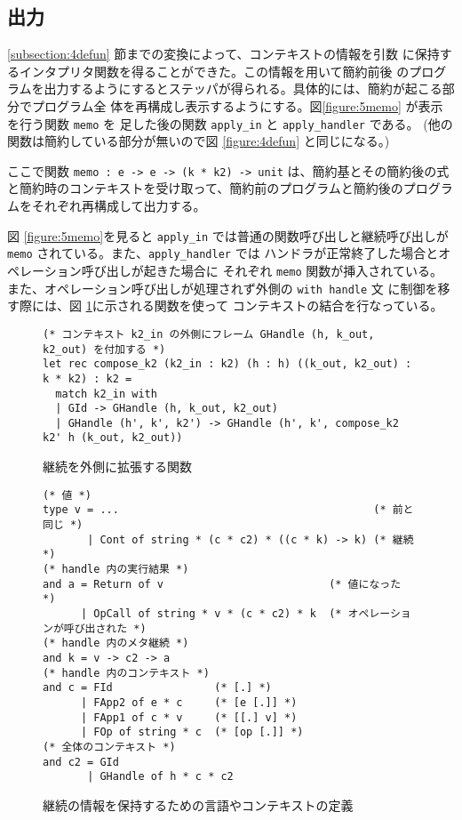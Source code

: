 \subsection{出力}
\label{subsection:memo}

\ref{subsection:4defun} 節までの変換によって、コンテキストの情報を引数
に保持するインタプリタ関数を得ることができた。この情報を用いて簡約前後
のプログラムを出力するようにするとステッパが得られる。具体的には、簡約が起こる部分でプログラム全
体を再構成し表示するようにする。図\ref{figure:5memo}
が表示を行う関数 \texttt{memo} を
足した後の関数 \texttt{apply\_in} と \texttt{apply\_handler}
である。
(他の関数は簡約している部分が無いので図 \ref{figure:4defun} と同じになる。)

ここで関数 \texttt{memo :\ e -> e -> (k * k2) -> unit} は、簡約基とその簡約後の式と簡約時のコンテキストを受け取って、簡約前のプログラムと簡約後のプログラムをそれぞれ再構成して出力する。

図 \ref{figure:5memo}を見ると \texttt{apply\_in} では普通の関数呼び出しと継続呼び出しが
\texttt{memo} されている。また、\texttt{apply\_handler} では
ハンドラが正常終了した場合とオペレーション呼び出しが起きた場合に
それぞれ \texttt{memo} 関数が挿入されている。
また、オペレーション呼び出しが処理されず外側の \texttt{with handle} 文
に制御を移す際には、図 \ref{figure:compose}に示される関数を使って
コンテキストの結合を行なっている。

\begin{figure}[t]
\begin{spacing}{0.9} 
\begin{verbatim}
(* コンテキスト k2_in の外側にフレーム GHandle (h, k_out, k2_out) を付加する *)
let rec compose_k2 (k2_in : k2) (h : h) ((k_out, k2_out) : k * k2) : k2 =
  match k2_in with
  | GId -> GHandle (h, k_out, k2_out)
  | GHandle (h', k', k2') -> GHandle (h', k', compose_k2 k2' h (k_out, k2_out))
\end{verbatim}
\caption{継続を外側に拡張する関数}
\label{figure:compose}
\end{spacing}
\end{figure}

\begin{figure}[t]
\begin{spacing}{0.9} 
\begin{verbatim}
(* 値 *)
type v = ...                                        (* 前と同じ *)
       | Cont of string * (c * c2) * ((c * k) -> k) (* 継続 *)
(* handle 内の実行結果 *)
and a = Return of v                          (* 値になった *)
      | OpCall of string * v * (c * c2) * k  (* オペレーションが呼び出された *)
(* handle 内のメタ継続 *)
and k = v -> c2 -> a
(* handle 内のコンテキスト *)
and c = FId                (* [.] *)
      | FApp2 of e * c     (* [e [.]] *)
      | FApp1 of c * v     (* [[.] v] *)
      | FOp of string * c  (* [op [.]] *)
(* 全体のコンテキスト *)
and c2 = GId
       | GHandle of h * c * c2
\end{verbatim}
\caption{継続の情報を保持するための言語やコンテキストの定義}
\label{figure:k_6cps}
\end{spacing}
\end{figure}

